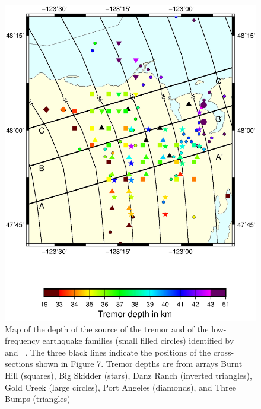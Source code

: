 \documentclass[draft]{agujournal2019}
\begin{document}
\begin{figure}
\noindent\includegraphics[width=\textwidth, trim={1cm 5cm 3.5cm 4cm},clip]{figures/depth_PWS_PWS.eps}
\caption{Map of the depth of the source of the tremor and of the low-frequency earthquake families (small filled circles) identified by ~ and ~. The three black lines indicate the positions of the cross-sections shown in Figure 7. Tremor depths are from arrays Burnt Hill (squares), Big Skidder (stars), Danz Ranch (inverted triangles),  Gold Creek (large circles), Port Angeles (diamonds), and Three Bumps (triangles)}
\label{pngfiguresample}
\end{figure}
\end{document}
